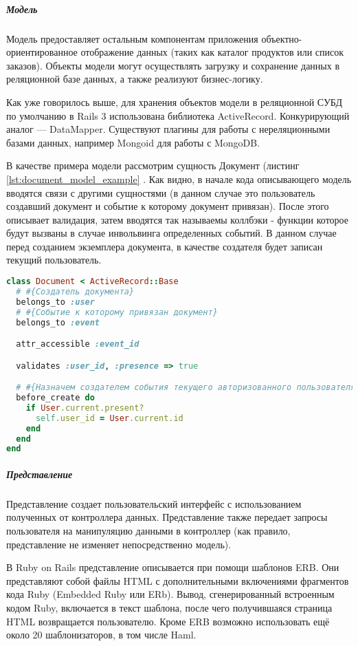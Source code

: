 \subparagraph{Модель} 
Модель предоставляет остальным компонентам приложения объектно-ориентированное
отображение данных (таких как каталог продуктов или список заказов). Объекты
модели могут осуществлять загрузку и сохранение данных в реляционной базе
данных, а также реализуют бизнес-логику.

Как уже говорилось выше, для хранения объектов модели в реляционной СУБД по
умолчанию в Rails 3 использована библиотека ActiveRecord. Конкурирующий аналог —
DataMapper. Существуют плагины для работы с нереляционными базами данных,
например Mongoid для работы с MongoDB.

В качестве примера модели рассмотрим сущность Документ (листинг
\ref{lst:document_model_example} .  Как видно, в начале кода описывающего модель вводятся связи с другими сущностями (в данном
случае это пользователь создавший документ и событие к которому документ
привязан). После этого описывает валидация, затем вводятся так называемы
коллбэки - функции которое будут вызваны в случае инвольвинга определенных
событий. В данном случае перед созданием экземплера документа, в качестве
создателя будет записан текущий пользователь.

\begin{lstlisting}[language=Ruby,caption=Модель документов
,label={lst:document_model_example}] 
class Document < ActiveRecord::Base
  # #{Создатель документа}
  belongs_to :user
  # #{Событие к которому привязан документ}
  belongs_to :event

  attr_accessible :event_id

  validates :user_id, :presence => true

  # #{Назначем создателем события текущего авторизованного пользователя}
  before_create do
    if User.current.present?
      self.user_id = User.current.id
    end
  end
end
\end{lstlisting}

\subparagraph{Представление}
Представление создает пользовательский интерфейс с использованием полученных от
контроллера данных. Представление также передает запросы пользователя на
манипуляцию данными в контроллер (как правило, представление не изменяет
непосредственно модель).

В Ruby on Rails представление описывается при помощи шаблонов ERB. Они
представляют собой файлы HTML с дополнительными включениями фрагментов кода Ruby
(Embedded Ruby или ERb). Вывод, сгенерированный встроенным кодом Ruby,
включается в текст шаблона, после чего получившаяся страница HTML возвращается
пользователю. Кроме ERB возможно использовать ещё около 20 шаблонизаторов, в том
числе Haml.

